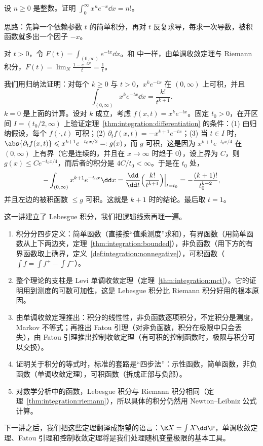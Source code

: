 \begin{workedexample}\label{we:integration:factorial}
设 $n\geqslant0$ 是整数。证明 $\displaystyle\int_0^\infty x^ne^{-x}\dd x=n!$。
\end{workedexample}
\begin{solution}
思路：先算一个依赖参数 $t$ 的简单积分，再对 $t$ 反复求导，每求一次导数，被积函数就多出一个因子 $-x$。

对 $t>0$，令 $F(t)=\int_{(0,\infty)}e^{-tx}\dd x$。和 中一样，由单调收敛定理与 Riemann 积分，$F(t)=\lim_N\frac{1-e^{-tN}}t=\frac1t$。

我们用归纳法证明：对每个 $k\geqslant0$ 与 $t>0$，$x^ke^{-tx}$ 在 $(0,\infty)$ 上可积，并且
\[
\int_{(0,\infty)}x^ke^{-tx}\dd x=\frac{k!}{t^{k+1}} .
\]
$k=0$ 是上面的计算。设对 $k$ 成立，考虑 $f(x,t)=x^ke^{-tx}$。固定 $t_0>0$，在开区间 $I=(t_0/2,\infty)$ 上验证定理~\ref{thm:integration:differentiation} 的条件：(1) 由归纳假设，每个 $f(\cdot,t)$ 可积；(2) $\partial_tf(x,t)=-x^{k+1}e^{-tx}$；(3) 当 $t\in I$ 时，$\abs{\partial_tf(x,t)}\leqslant x^{k+1}e^{-t_0x/2}=:g(x)$，而 $g$ 可积，这是因为 $x^{k+1}e^{-t_0x/4}$ 在 $(0,\infty)$ 上有界（它是连续的，并且在 $x\to\infty$ 时趋于 $0$），设上界为 $C$，则 $g(x)\leqslant Ce^{-t_0x/4}$，而后者的积分是 $4C/t_0<\infty$。于是在 $t_0$ 处，
\[
-\int_{(0,\infty)}x^{k+1}e^{-t_0x}\dd x=\frac{\dd}{\dd t}\Bigl(\frac{k!}{t^{k+1}}\Bigr)\Big|_{t=t_0}=-\frac{(k+1)!}{t_0^{k+2}} ,
\]
并且左边的被积函数 $\leqslant g$ 可积。这就是 $k+1$ 时的结论。最后取 $t=1$。
\end{solution}


这一讲建立了 Lebesgue 积分，我们把逻辑线索再理一遍。
\begin{enumerate}
\item 积分分四步定义：简单函数（直接按“值乘测度”求和），有界函数（用简单函数从上下两边夹，定理~\ref{thm:integration:bounded}），非负函数（用下方的有界函数取上确界，定义~\ref{def:integration:nonnegative}），可积函数（$\int f=\int f^+-\int f^-$）。
\item 整个理论的支柱是 Levi 单调收敛定理（定理~\ref{thm:integration:mct}）。它的证明用到测度的可数可加性，这是 Lebesgue 积分比 Riemann 积分好用的根本原因。
\item 由单调收敛定理推出：积分的线性性，非负函数逐项积分，不定积分是测度，Markov 不等式；再推出 Fatou 引理（对非负函数，积分在极限中只会丢失），由 Fatou 引理推出控制收敛定理（有可积的控制函数时，极限与积分可以交换）。
\item 证明关于积分的等式时，标准的套路是“四步法”：示性函数，简单函数，非负函数（单调收敛定理），可积函数（拆成正部与负部）。
\item 对数学分析中的函数，Lebesgue 积分与 Riemann 积分相同（定理~\ref{thm:integration:riemann}），所以具体的积分仍然用 Newton--Leibniz 公式计算。
\end{enumerate}
下一讲之后，我们把这些定理翻译成期望的语言：$\E X=\int X\dd\P$，单调收敛定理、Fatou 引理和控制收敛定理将是我们处理随机变量极限的基本工具。

